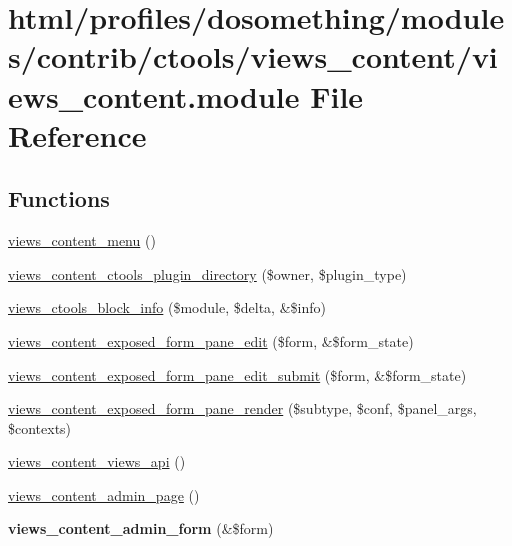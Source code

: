 \hypertarget{views__content_8module}{
\section{html/profiles/dosomething/modules/contrib/ctools/views\_\-content/views\_\-content.module File Reference}
\label{views__content_8module}
}
\subsection*{Functions}
\begin{DoxyCompactItemize}
\item 
\hyperlink{views__content_8module_a8280857d807868e12658b7ce5f582040}{views\_\-content\_\-menu} ()
\item 
\hyperlink{views__content_8module_ad80b6f3ed37ac841a555f303d0bc0175}{views\_\-content\_\-ctools\_\-plugin\_\-directory} (\$owner, \$plugin\_\-type)
\item 
\hyperlink{views__content_8module_af683ec2b8c9e15e7badc8139d5c7f99f}{views\_\-ctools\_\-block\_\-info} (\$module, \$delta, \&\$info)
\item 
\hyperlink{views__content_8module_aa1cc8e44cc4b89d09d0f245735a8d638}{views\_\-content\_\-exposed\_\-form\_\-pane\_\-edit} (\$form, \&\$form\_\-state)
\item 
\hyperlink{views__content_8module_a18f6505d323ff42d01e7354cf73e97fc}{views\_\-content\_\-exposed\_\-form\_\-pane\_\-edit\_\-submit} (\$form, \&\$form\_\-state)
\item 
\hyperlink{views__content_8module_a59edb5639e9d11e8883d2750bd8b9988}{views\_\-content\_\-exposed\_\-form\_\-pane\_\-render} (\$subtype, \$conf, \$panel\_\-args, \$contexts)
\item 
\hyperlink{views__content_8module_a8fd4ad93e1b822d81a655961270cc26b}{views\_\-content\_\-views\_\-api} ()
\item 
\hyperlink{views__content_8module_af58660a89e1278c2017a52d9419cb041}{views\_\-content\_\-admin\_\-page} ()
\item 
\hypertarget{views__content_8module_a3be9324362d518ffe9548f73196ddec7}{
{\bfseries views\_\-content\_\-admin\_\-form} (\&\$form)}
\label{views__content_8module_a3be9324362d518ffe9548f73196ddec7}


\end{DoxyCompactItemize}
